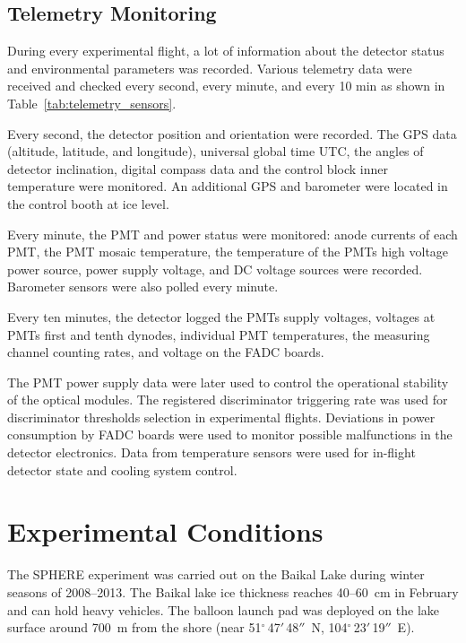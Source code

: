 \documentclass[universe,article,accept,moreauthors,pdftex]{Definitions/mdpi}
\begin{document}



\subsection{Telemetry Monitoring\label{sect:telemetry}}

During every experimental flight, a lot of information about the detector status and environmental parameters was recorded. Various telemetry data were received and checked every second, every minute, and every 10 min as shown in Table~\ref{tab:telemetry_sensors}.

Every second, the detector position and orientation were recorded. The GPS data (altitude, latitude, and longitude), universal global time UTC, the angles of detector inclination, digital compass data and the control block inner temperature were monitored. An additional GPS and barometer were located in the control booth at ice level.

Every minute, the PMT and power status were monitored: anode currents of each PMT, the PMT mosaic temperature, the temperature of the PMTs high voltage power source, power supply voltage, and DC voltage sources were recorded. Barometer sensors were also polled every minute.

Every ten minutes, the detector logged the PMTs supply voltages, voltages at PMTs first and tenth dynodes, individual PMT temperatures, the measuring channel counting rates, and voltage on the FADC boards.

The PMT power supply data were later used to control the operational stability of the optical modules. The registered discriminator triggering rate was used for discriminator thresholds selection in experimental flights. Deviations in power consumption by FADC boards were used to monitor possible malfunctions in the detector electronics. Data from temperature sensors were used for in-flight detector state and cooling system control.




\section{Experimental Conditions}
\label{sect:data}
 
The SPHERE experiment was carried out on the Baikal Lake during winter seasons of 2008--2013. The Baikal lake ice thickness reaches 40--60~cm in February and can hold heavy vehicles. The balloon launch pad was deployed on the lake surface around 700~m from the shore (near 51$^\circ$\,47$'$\,48$''$~N, 104$^\circ$\,23$'$\,19$''$~E).
\end{document}
